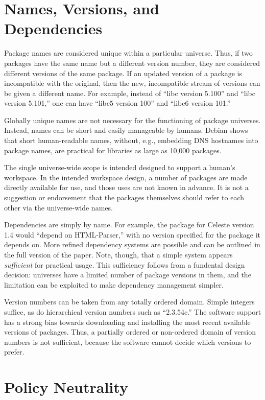 \documentclass{IEEEtran}
\begin{document}
\section{Names, Versions, and Dependencies}

Package names are considered unique within a particular universe.
Thus, if two packages have the same name but a different version
number, they are considered different versions of the same package.
If an updated version of a package is incompatible with the original,
then the new, incompatible stream of versions can be given a different
name.  For example, instead of ``libc version 5.100'' and ``libc
version 5.101,'' one can have ``libc5 version 100'' and ``libc6
version 101.''

Globally unique names are not necessary for the functioning of package
universes.  Instead, names can be short and easily manageable by
humans.  Debian shows that short human-readable names, without, e.g.,
embedding DNS hostnames into package names, are practical for
libraries as large as 10,000 packages.

The single universe-wide scope is intended designed to support a
human's workspace.  In the intended workspace design, a number of
packages are made directly available for use, and those uses are not
known in advance.  It is not a suggestion or endorsement that the
packages themselves should refer to each other via the universe-wide
names.


Dependencies are simply by name.  For example, the package for Celeste
version 1.4 would ``depend on HTML-Parser,'' with no version specified
for the package it depends on.  More refined dependency systems are
possible and can be outlined in the full version of the paper.  Note,
though, that a simple system appears \emph{sufficient} for practical
usage.  This sufficiency follows from a fundental design decision:
universes have a limited number of package versions in them, and the
limitation can be exploited to make dependency management simpler.


Version numbers can be taken from any totally ordered domain.  Simple
integers suffice, as do hierarchical version numbers such as
``2.3.54c.''  The software support has a strong bias towards
downloading and installing the most recent available versions of
packages.  Thus, a partially ordered or non-ordered domain of version
numbers is not sufficient, because the software cannot decide which
versions to prefer.




\section{Policy Neutrality}
\end{document}
